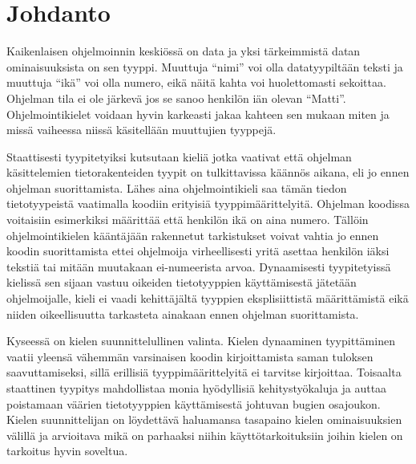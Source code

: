 \chapter{Johdanto} \label{Johdanto}

Kaikenlaisen ohjelmoinnin keskiössä on data ja yksi tärkeimmistä datan
ominaisuuksista on sen tyyppi. Muuttuja “nimi” voi olla datatyypiltään
teksti ja muuttuja “ikä” voi olla numero, eikä näitä kahta voi
huolettomasti sekoittaa. Ohjelman tila ei ole järkevä jos se sanoo
henkilön iän olevan “Matti”. Ohjelmointikielet voidaan hyvin karkeasti
jakaa kahteen sen mukaan miten ja missä vaiheessa niissä käsitellään
muuttujien tyyppejä.

Staattisesti tyypitetyiksi kutsutaan kieliä jotka vaativat että ohjelman
käsittelemien tietorakenteiden tyypit on tulkittavissa käännös aikana,
eli jo ennen ohjelman suorittamista. Lähes aina ohjelmointikieli saa
tämän tiedon tietotyypeistä vaatimalla koodiin erityisiä
tyyppimäärittelyitä. Ohjelman koodissa voitaisiin esimerkiksi määrittää
että henkilön ikä on aina numero. Tällöin ohjelmointikielen kääntäjään
rakennetut tarkistukset voivat vahtia jo ennen koodin suorittamista
ettei ohjelmoija virheellisesti yritä asettaa henkilön iäksi tekstiä tai
mitään muutakaan ei-numeerista arvoa. Dynaamisesti tyypitetyissä
kielissä sen sijaan vastuu oikeiden tietotyyppien käyttämisestä jätetään
ohjelmoijalle, kieli ei vaadi kehittäjältä tyyppien eksplisiittistä
määrittämistä eikä niiden oikeellisuutta tarkasteta ainakaan ennen
ohjelman suorittamista.

Kyseessä on kielen suunnittelullinen valinta. Kielen dynaaminen
tyypittäminen vaatii yleensä vähemmän varsinaisen koodin kirjoittamista
saman tuloksen saavuttamiseksi, sillä erillisiä tyyppimäärittelyitä ei
tarvitse kirjoittaa. Toisaalta staattinen tyypitys mahdollistaa monia
hyödyllisiä kehitystyökaluja ja auttaa poistamaan väärien tietotyyppien
käyttämisestä johtuvan bugien osajoukon. Kielen suunnittelijan on
löydettävä haluamansa tasapaino kielen ominaisuuksien välillä ja
arvioitava mikä on parhaaksi niihin käyttötarkoituksiin joihin kielen on
tarkoitus hyvin soveltua.